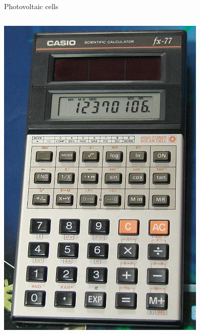 \documentclass{beamer}
\begin{document}
\begin{frame}{Photovoltaic cells}
\begin{columns}
\begin{column}{.4\textwidth}
    \includegraphics[width=\textwidth]{./Slike/casio-solar-calculator}
  \end{column}
 \end{columns}

\end{frame}
\end{document}
